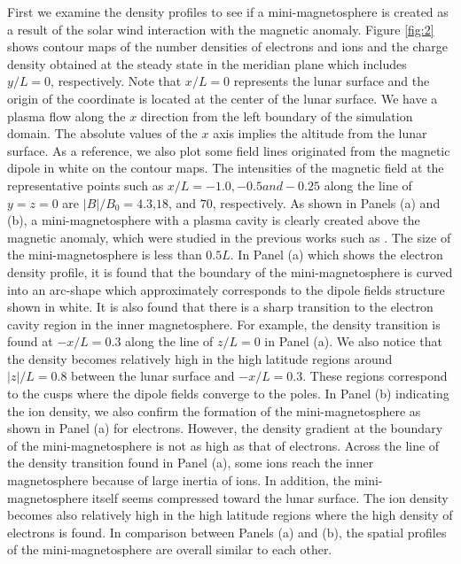 \documentclass[draft,jgrga]{agutex2015}
\begin{document}
\begin{article}
First we examine the density profiles to see 
if a mini-magnetosphere is created as a result of 
the solar wind interaction with the magnetic anomaly.
Figure \ref{fig:2} shows contour maps of the number densities of electrons and ions  
and the charge density obtained at the steady state 
in the meridian plane which includes $y/L = 0$, respectively. 
Note that $x/L=0$ represents the lunar surface and 
the origin of the coordinate is located at the center of the lunar surface.
We have a plasma flow along the $x$ direction from the left boundary of 
the simulation domain. 
The absolute values of the $x$ axis implies the altitude from the lunar surface.
As a reference, 
we also plot some field lines originated from the magnetic dipole 
in white on the contour maps.
The intensities of the magnetic field at the representative points 
such as $x/L=-1.0, -0.5 and -0.25$ along the line of $y=z=0$ 
are $|B|/B_{\mathrm{0}} = 4.3$,$18$, and $70$, respectively.
As shown in Panels (a) and (b), 
a mini-magnetosphere with a plasma cavity is clearly 
created above the magnetic anomaly, 
which were studied in the previous works such as
\citep[e.g.][]{Harnett2000,Harnett2003,Halekas2008b,Bamford2012}.
The size of the mini-magnetosphere is less than $0.5L$.
In Panel (a) which shows the electron density profile, 
it is found that the boundary of the mini-magnetosphere is curved 
into an arc-shape which approximately corresponds to the dipole fields structure
shown in white.
It is also found that there is a sharp transition to 
the electron cavity region in the inner magnetosphere. 
For example, 
the density transition is found at $-x/L = 0.3$ 
along the line of $z/L =0$ in Panel (a).
We also notice that the density becomes relatively high 
in the high latitude regions around
$|z|/L=0.8$ between the lunar surface and $-x/L=0.3$.
These regions correspond to the cusps where the dipole fields converge to the poles.
In Panel (b) indicating the ion density, 
we also confirm the formation of the mini-magnetosphere as shown 
in Panel (a) for electrons.
However, 
the density gradient at the boundary of the mini-magnetosphere is 
not as high as that of electrons.
Across the line of the density transition found in Panel (a), 
some ions reach the inner magnetosphere because of large inertia of ions. 
In addition, the mini-magnetosphere itself seems compressed toward the lunar surface.
The ion density becomes also relatively high in the high latitude regions 
where the high density of electrons is found. 
In comparison between Panels (a) and (b), 
the spatial profiles of the mini-magnetosphere are overall similar to each other. 

\end{article}
\end{document}
